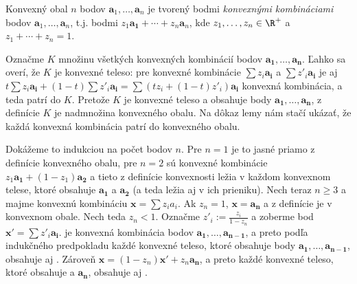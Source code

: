 \begin{shaded}
\begin{lema}
  \label{lm:KO:1}
Konvexný obal $n$ bodov $\bm{a}_1,\ldots,\bm{a}_n$ je 
tvorený bodmi {\em konvexnými kombináciami} bodov  $\bm{a}_1,\ldots,\bm{a}_n$, t.j.
bodmi $z_1\bm{a_1}+\cdots+z_n\bm{a}_n$,
 kde \hbox{$z_1,\ldots,z_n\in\R^+$} a $z_1+\cdots+z_n=1$.  
\end{lema}


\begin{dokaz}
  Označme $K$ množinu všetkých konvexných kombinácií bodov $\bm{a_1},\ldots,\bm{a_n}$.
  Ľahko sa overí, že $K$
  je konvexné teleso: pre konvexné kombinácie  $\sum z_i\bm{a_i}$ a $\sum z'_i\bm{a_i}$ je
  aj $t\sum z_i\bm{a_i} + (1-t)\sum z'_i\bm{a_i} = \sum (tz_i+(1-t)z'_i)\bm{a_i}$ konvexná kombinácia,
  a teda patrí do $K$. Pretože $K$ je konvexné teleso a obsahuje body $\bm{a_1},\ldots,\bm{a_n}$,
  z definície $K$ je nadmnožina konvexného obalu. Na dôkaz lemy nám stačí ukázať,
  že každá konvexná kombinácia patrí do konvexného obalu.

  
  \noindent
  Dokážeme to indukciou na počet bodov $n$. Pre $n=1$ je to jasné priamo z definície konvexného obalu,
  pre $n=2$ sú konvexné kombinácie $z_1\bm{a_1}+(1-z_1)\bm{a_2}$ a tieto z definície
  konvexnosti ležia v každom konvexnom telese, ktoré obsahuje $\bm{a_1}$ a $\bm{a_2}$ (a teda
  ležia aj v ich prieniku).
  Nech teraz $n\ge 3$ a majme konvexnú kombináciu $\bm{x}=\sum z_ia_i$. Ak $z_n=1$, $\bm{x}=\bm{a_n}$
  a z definície  je v konvexnom obale. Nech teda $z_n<1$. Označme $z'_i:=\frac{z_i}{1-z_n}$
  a zoberme bod $\bm{x'}=\sum z'_i\bm{a_i}$.  je konvexná kombinácia bodov $\bm{a_1},\ldots,\bm{a_{n-1}}$,
  a preto podľa indukčného predpokladu každé konvexné teleso, ktoré obsahuje body $\bm{a_1},\ldots,\bm{a_{n-1}}$,
  obsahuje aj . Zároveň $\bm{x}=(1-z_n)\bm{x'}+z_n\bm{a_n}$, a preto každé konvexné teleso,
  ktoré obsahuje  a $\bm{a_n}$, obsahuje aj .
\end{dokaz}

\noindent
\begin{minipage}[t]{6cm}
  \vspace{0pt}
\begin{center}
\end{center}
\end{minipage}
\end{shaded}
